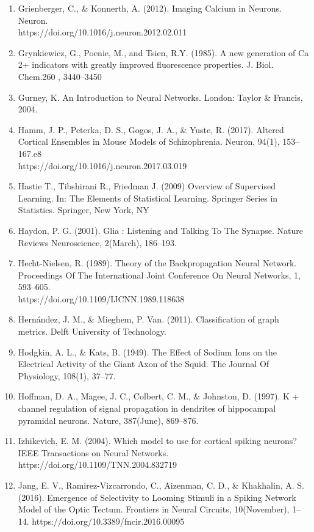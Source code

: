 \documentclass[11pt,titlepage]{article}
\begin{document}
\begin{spacing}{1}
\begin{enumerate}
\item Grienberger, C., \& Konnerth, A. (2012). Imaging Calcium in Neurons. Neuron. \\https://doi.org/10.1016/j.neuron.2012.02.011
\item Grynkiewicz, G., Poenie, M., and Tsien, R.Y. (1985). A new generation of Ca 2+ indicators with greatly improved fluorescence properties. J. Biol. Chem.260 , 3440–3450
\item Gurney, K. An Introduction to Neural Networks. London: Taylor \& Francis, 2004.
\item Hamm, J. P., Peterka, D. S., Gogos, J. A., \& Yuste, R. (2017). Altered Cortical Ensembles in Mouse Models of Schizophrenia. Neuron, 94(1), 153–167.e8\\https://doi.org/10.1016/j.neuron.2017.03.019
\item Hastie T., Tibshirani R., Friedman J. (2009) Overview of Supervised Learning. In: The Elements of Statistical Learning. Springer Series in Statistics. Springer, New York, NY
\item Haydon, P. G. (2001). Glia : Listening and Talking To The Synapse. Nature Reviews Neuroscience, 2(March), 186–193.
\item Hecht-Nielsen, R. (1989). Theory of the Backpropagation Neural Network. Proceedings Of The International Joint Conference On Neural Networks, 1, 593–605.\\https://doi.org/10.1109/IJCNN.1989.118638
\item Hernández, J. M., \& Mieghem, P. Van. (2011). Classification of graph metrics. Delft University of Technology.
\item Hodgkin, A. L., \& Kats, B. (1949). The Effect of Sodium Ions on the Electrical Activity of the Giant Axon of the Squid. The Journal Of Physiology, 108(1), 37–77.
\item Hoffman, D. A., Magee, J. C., Colbert, C. M., \& Johnston, D. (1997). K + channel regulation of signal propagation in dendrites of hippocampal pyramidal neurons. Nature, 387(June), 869–876.
\item Izhikevich, E. M. (2004). Which model to use for cortical spiking neurons? IEEE Transactions on Neural Networks. https://doi.org/10.1109/TNN.2004.832719
\item Jang, E. V., Ramirez-Vizcarrondo, C., Aizenman, C. D., \& Khakhalin, A. S. (2016). Emergence of Selectivity to Looming Stimuli in a Spiking Network Model of the Optic Tectum. Frontiers in Neural Circuits, 10(November), 1–14. https://doi.org/10.3389/fncir.2016.00095

\end{enumerate}
\end{spacing}
\end{document}
